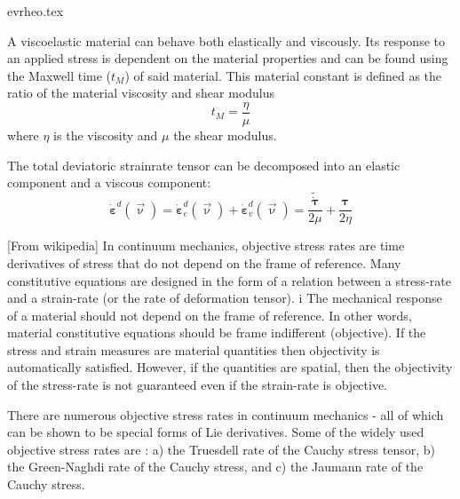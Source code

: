 
\begin{flushright} {\tiny {\color{gray} evrheo.tex}} \end{flushright}

A viscoelastic material can behave both elastically and viscously. Its response to 
an applied stress is dependent on the material properties and can be found using 
the Maxwell time ($t_M$) of said material. 
This material constant is defined as the ratio of the material viscosity and shear modulus
\[
t_M = \frac{\eta}{\mu}
\]
where $\eta$ is the viscosity and $\mu$ the shear modulus.

The total deviatoric strainrate tensor can be decomposed into an elastic component and a viscous component:
\[
\dot{{\bm \varepsilon}}^d(\vec\upnu) = 
\dot{{\bm \varepsilon}}^d_e(\vec\upnu)  + \dot{{\bm \varepsilon}}^d_v(\vec\upnu)= 
\frac{\tilde{\dot{\bm \tau}}}{2\mu}
+\frac{\bm \tau}{2 \eta}
\]

[From wikipedia] In continuum mechanics, objective stress rates are time derivatives of 
stress that do not depend on the frame of reference. 
Many constitutive equations are designed in the form of a relation between a 
stress-rate and a strain-rate (or the rate of deformation tensor). i
The mechanical response of a material should not depend on the frame of reference. 
In other words, material constitutive equations should be frame indifferent (objective). 
If the stress and strain measures are material quantities then objectivity is automatically 
satisfied. However, if the quantities are spatial, then the objectivity of the stress-rate 
is not guaranteed even if the strain-rate is objective.

There are numerous objective stress rates in continuum mechanics - 
all of which can be shown to be special forms of Lie derivatives. 
Some of the widely used objective stress rates are \cite{holm20}:
a) the Truesdell rate of the Cauchy stress tensor,
b) the Green-Naghdi rate of the Cauchy stress, and
c) the Jaumann rate of the Cauchy stress.

